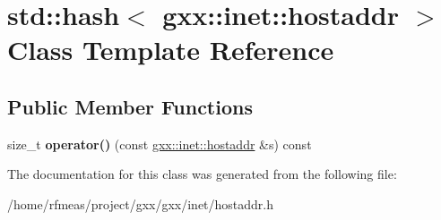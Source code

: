 \hypertarget{classstd_1_1hash_3_01gxx_1_1inet_1_1hostaddr_01_4}{}\section{std\+:\+:hash$<$ gxx\+:\+:inet\+:\+:hostaddr $>$ Class Template Reference}
\label{classstd_1_1hash_3_01gxx_1_1inet_1_1hostaddr_01_4}
\subsection*{Public Member Functions}
\begin{DoxyCompactItemize}
\item 
size\+\_\+t {\bfseries operator()} (const \hyperlink{classgxx_1_1hostaddr}{gxx\+::inet\+::hostaddr} \&s) const \hypertarget{classstd_1_1hash_3_01gxx_1_1inet_1_1hostaddr_01_4_a126ff3557b8d7113dc6f9d12442dc97c}{}\label{classstd_1_1hash_3_01gxx_1_1inet_1_1hostaddr_01_4_a126ff3557b8d7113dc6f9d12442dc97c}

\end{DoxyCompactItemize}


The documentation for this class was generated from the following file\+:\begin{DoxyCompactItemize}
\item 
/home/rfmeas/project/gxx/gxx/inet/hostaddr.\+h\end{DoxyCompactItemize}
